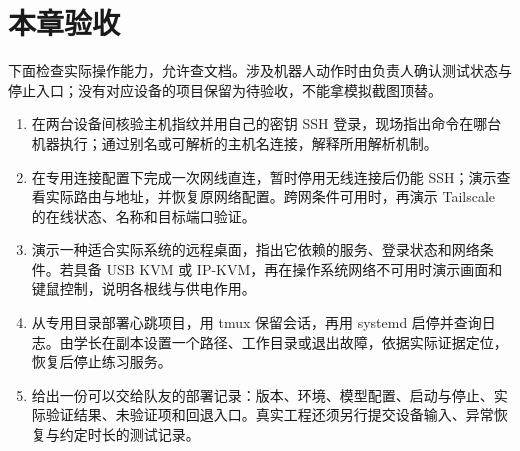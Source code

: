 \section{本章验收}
下面检查实际操作能力，允许查文档。涉及机器人动作时由负责人确认测试状态与停止入口；没有对应设备的项目保留为待验收，不能拿模拟截图顶替。
\begin{enumerate}
  \item 在两台设备间核验主机指纹并用自己的密钥 SSH 登录，现场指出命令在哪台机器执行；通过别名或可解析的主机名连接，解释所用解析机制。
  \item 在专用连接配置下完成一次网线直连，暂时停用无线连接后仍能 SSH；演示查看实际路由与地址，并恢复原网络配置。跨网条件可用时，再演示 Tailscale 的在线状态、名称和目标端口验证。
  \item 演示一种适合实际系统的远程桌面，指出它依赖的服务、登录状态和网络条件。若具备 USB KVM 或 IP-KVM，再在操作系统网络不可用时演示画面和键鼠控制，说明各根线与供电作用。
  \item 从专用目录部署心跳项目，用 tmux 保留会话，再用 systemd 启停并查询日志。由学长在副本设置一个路径、工作目录或退出故障，依据实际证据定位，恢复后停止练习服务。
  \item 给出一份可以交给队友的部署记录：版本、环境、模型配置、启动与停止、实际验证结果、未验证项和回退入口。真实工程还须另行提交设备输入、异常恢复与约定时长的测试记录。
\end{enumerate}
\endgroup
